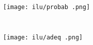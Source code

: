 \begin{figure}[H]\begin{center}\texttt{[image: ilu/probab .png]}\end{center}\end{figure}


\begin{lstlisting}[language=html]
  
\end{lstlisting}






%











\begin{figure}[H]\begin{center}\texttt{[image: ilu/adeq .png]}\end{center}\end{figure}



